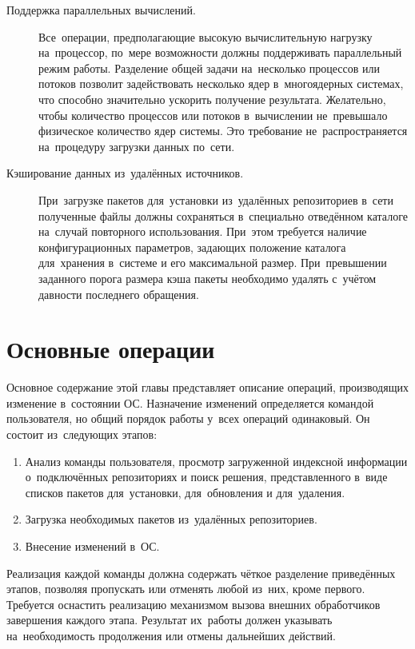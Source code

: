 \begin{description}
\item[Поддержка параллельных вычислений.]
Все~операции, предполагающие высокую вычислительную нагрузку на~процессор,
по~мере возможности должны поддерживать параллельный режим работы.
Разделение общей задачи на~несколько процессов или потоков позволит задействовать несколько ядер в~многоядерных системах,
что способно значительно ускорить получение результата. 
Желательно, чтобы количество процессов или потоков в~вычислении не~превышало физическое количество ядер системы.
Это требование не~распространяется на~процедуру загрузки данных по~сети.

\item[Кэширование данных из~удалённых источников.]
При~загрузке пакетов для~установки из~удалённых репозиториев в~сети
полученные файлы должны сохраняться в~специально отведённом каталоге на~случай повторного использования.
При~этом требуется наличие конфигурационных параметров, задающих положение каталога для~хранения в~системе и его максимальной размер.
При~превышении заданного порога размера кэша пакеты необходимо удалять с~учётом давности последнего обращения.

\end{description}

\section{Основные операции}

Основное содержание этой главы представляет описание операций, производящих изменение в~состоянии ОС.
Назначение  изменений определяется командой пользователя, но общий порядок работы у~всех операций одинаковый.
Он состоит из~следующих этапов:

\begin{enumerate}

\item{
Анализ команды пользователя, просмотр загруженной индексной информации о~подключённых репозиториях
и поиск решения, представленного в~виде списков пакетов для~установки, для~обновления и для~удаления.
}

\item {Загрузка необходимых пакетов из~удалённых репозиториев.}
\item {Внесение изменений в~ОС.}

\end{enumerate}

Реализация каждой команды должна содержать чёткое разделение приведённых этапов,
позволяя пропускать или отменять любой из~них, кроме первого.
Требуется оснастить реализацию механизмом вызова внешних обработчиков завершения каждого этапа.
Результат их~работы должен указывать на~необходимость продолжения или отмены дальнейших действий.

